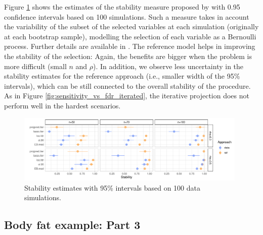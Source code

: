 \documentclass[a4]{article}
\theoremstyle{definition}
\begin{document}
Figure \ref{fig:stability_iterated} shows the estimates of the stability
measure proposed by \cite{paper:stability} with 0.95 confidence
intervals based on 100 simulations. Such a measure takes in account
the variability of the subset of the selected variables at each
simulation (originally at each bootstrap sample), modelling the
selection of each variable as a Bernoulli process. Further details are
available in \cite{paper:stability}. The reference model helps in
improving the stability of the selection: Again, the benefits are
bigger when the problem is more difficult (small $n$ and $\rho$). In
addition, we observe less uncertainty in the stability estimates for
the reference approach (i.e., smaller width of the 95\% intervals),
which can be still connected to the overall stability of the
procedure. As in Figure \ref{fig:sensitivity_vs_fdr_iterated}, the iterative
projection does not perform well in the hardest scenarios. 

\begin{figure}[tp]
  \centering
  \includegraphics[width=0.98\textwidth]{graphics/stability_iterated.pdf}
  \caption{Stability estimates with 95\% intervals based on 100 data simulations.\\}
  \label{fig:stability_iterated}
\end{figure}


\hypertarget{bodyfat-2}{%
\subsection{Body fat example: Part 3}\label{bodyfat-3}}
\end{document}
